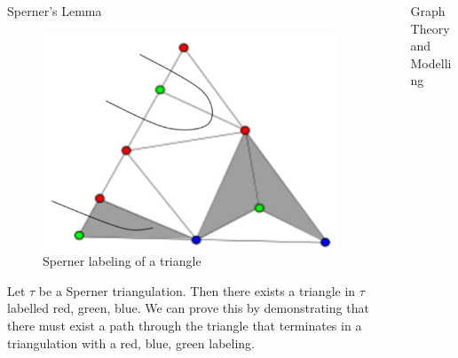 \documentclass[final]{beamer}
\newlength{\sepwid}
\newlength{\onecolwid}
\newlength{\twocolwid}
\begin{document}
\begin{frame}[t]
\begin{columns}[t]
\begin{column}{\twocolwid}
\begin{columns}[t,totalwidth=\twocolwid]
\begin{column}{\onecolwid}
\begin{block}{Sperner's Lemma}

\begin{figure}
\includegraphics[width=0.8\linewidth]{Capture1.PNG}
\caption{Sperner labeling of a triangle}
\end{figure}

Let $\tau$ be a Sperner triangulation. Then there exists a triangle in $\tau$ labelled red, green, blue. We can prove this by demonstrating that there must exist a path through the triangle that terminates in a triangulation with a red, blue, green labeling.


\end{block}


\end{column} %

\end{columns} %

\end{column} %

\begin{column}{\sepwid}\end{column} %

\begin{column}{\onecolwid} %


\begin{block}{Graph Theory and Modelling}


\end{block}
\end{column}
\end{columns}
\end{frame}
\end{document}
